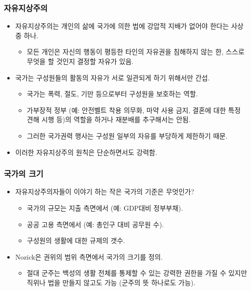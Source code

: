 \documentclass[aspectratio=169,xcolor=dvipsnames,handout]{beamer}
\begin{document}
\begin{frame}[<+->]
\frametitle{자유지상주의}
    \begin{itemize}
        \item 자유지상주의는 개인의 삶에 국가에 의한 법에 강압적 지배가 없어야 한다는 사상 중 하나.
        \begin{itemize}
            \item 모든 개인은 자신의 행동이 평등한 타인의 자유권을 침해하지 않는 한, 스스로 무엇을 할 것인지 결정할 자유가 있음.
        \end{itemize}
    \item 국가는 구성원들의 활동의 자유가 서로 일관되게 하기 위해서만 간섭.
        \begin{itemize}
        \item 국가는 폭력, 절도, 기만 등으로부터 구성원을 보호하는 역할.
        \item 가부장적 정부 (예: 안전벨트 착용 의무화, 마약 사용 금지, 결혼에 대한 특정 견해 시행 등)의 역할을 하거나 재분배를 추구해서는 안됨.
        \item 그러한 국가권력 행사는 구성원 일부의 자유를 부당하게 제한하기 때문.
        \end{itemize}
    \item 이러한 자유지상주의 원칙은 단순하면서도 강력함.
    \end{itemize}
\end{frame}

\begin{frame}[<+->]
\frametitle{국가의 크기}
    \begin{itemize}
        \item 자유지상주의자들이 이야기 하는 작은 국가의 기준은 무엇인가?
        \begin{itemize}
            \item 국가의 규모는 지출 측면에서 (예: GDP대비 정부부채).
            \item 공공 고용 측면에서 (예: 총인구 대비 공무원 수).
            \item 구성원의 생활에 대한 규제의 갯수.
        \end{itemize}
        \item Nozick은 권위의 범위 측면에서 국가의 크기를 정의.
        \begin{itemize}
            \item 절대 군주는 백성의 생활 전체를 통제할 수 있는 강력한 권한을 가질 수 있지만 직위나 법을 만들지 않고도 가능 (군주의 뜻 하나로도 가능).
        \end{itemize}
    \end{itemize}
\end{frame}
\end{document}
